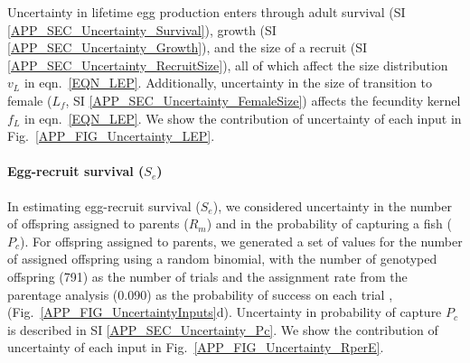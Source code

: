 \documentclass[12pt, oneside]{article}   	%
\begin{document}
Uncertainty in lifetime egg production enters through adult survival (SI \ref{APP_SEC_Uncertainty_Survival}), growth (SI \ref{APP_SEC_Uncertainty_Growth}), and the size of a recruit (SI \ref{APP_SEC_Uncertainty_RecruitSize}), all of which affect the size distribution $v_L$ in eqn.\ \ref{EQN_LEP}. Additionally, uncertainty in the size of transition to female ($L_f$, SI \ref{APP_SEC_Uncertainty_FemaleSize}) affects the fecundity kernel $f_L$ in eqn.\ \ref{EQN_LEP}. We show the contribution of uncertainty of each input in Fig.\ \ref{APP_FIG_Uncertainty_LEP}.

\paragraph{Egg-recruit survival ($S_e$)} \label{APP_SEC_Uncertainty_Egg-recruit-surv}

In estimating egg-recruit survival ($S_e$), we considered uncertainty in the number of offspring assigned to parents ($R_m$) and in the probability of capturing a fish ($P_c$). For offspring assigned to parents, we generated a set of values for the number of assigned offspring using a random binomial, with the number of genotyped offspring (791) as the number of trials and the assignment rate from the parentage analysis (0.090) as the probability of success on each trial \citep{catalanoInPrepconnectivity}, (Fig.\ \ref{APP_FIG_UncertaintyInputs}d). Uncertainty in probability of capture $P_c$ is described in SI \ref{APP_SEC_Uncertainty_Pc}. We show the contribution of uncertainty of each input in Fig.\ \ref{APP_FIG_Uncertainty_RperE}.


\end{document}
